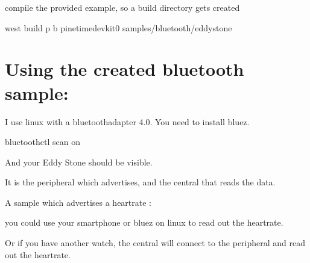 \documentclass[letterpaper,10pt,english]{sphinxmanual}
\begin{document}
  compile the provided example, so a build directory gets created

\begin{sphinxVerbatim}[commandchars=\\\{\}]
 west build \PYGZhy{}p \PYGZhy{}b pinetime\PYGZus{}devkit0 samples/bluetooth/eddystone
\end{sphinxVerbatim}



\section{Using the created bluetooth sample:}
\label{\detokenize{bluetooth:using-the-created-bluetooth-sample}}
I use linux with a bluetoothadapter 4.0.
You need to install bluez.

\begin{sphinxVerbatim}[commandchars=\\\{\}]
bluetoothctl
scan on
\end{sphinxVerbatim}

And your Eddy Stone should be visible.

It is the peripheral which advertises, and the central that reads the data.

A sample which advertises a heartrate :

\begin{sphinxVerbatim}[commandchars=\\\{\}]
     
\end{sphinxVerbatim}

you could use your smartphone or bluez on linux to read out the heartrate.

Or if you have another watch, the central will connect to the peripheral and read out the heartrate.

\begin{sphinxVerbatim}[commandchars=\\\{\}]
     
\end{sphinxVerbatim}
\end{document}
